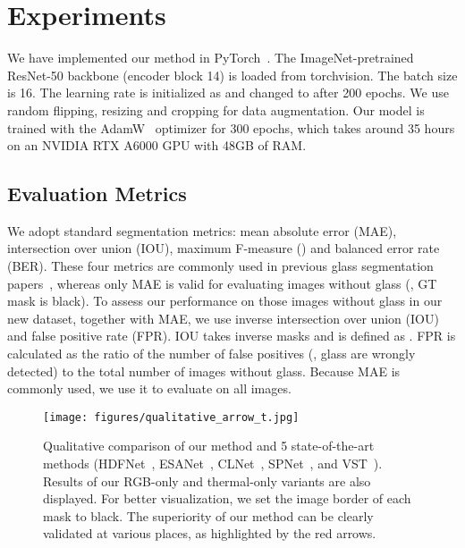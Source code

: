 \section{Experiments}
\label{sec:exp}

We have implemented our method in PyTorch~\cite{paszke2019pytorch}. The ImageNet-pretrained ResNet-50 backbone (encoder block 14) is loaded from torchvision. The batch size is 16. The learning rate is initialized as  and changed to  after 200 epochs. We use random flipping, resizing and cropping for data augmentation. Our model is trained with the  AdamW~\cite{loshchilov2017decoupled} optimizer for 300 epochs, which takes around 35 hours on an NVIDIA RTX A6000 GPU with 48GB of RAM.


\subsection{Evaluation Metrics}

We adopt standard segmentation metrics: mean absolute error (MAE), intersection over union (IOU), maximum F-measure () and balanced error rate (BER). These four metrics are commonly used in previous glass segmentation papers~\cite{mei2020don,lin2021rich,He_2021_ICCV}, whereas only MAE is valid for evaluating images without glass (\ie, GT mask is black). To assess our performance on those images without glass in our new dataset, together with MAE, we use inverse intersection over union (IOU) and false positive rate (FPR). IOU takes inverse masks and is defined as . FPR is calculated as the ratio of the number of false positives (\ie, glass are wrongly detected) to the total number of images without glass. Because  MAE is commonly used, we use it to evaluate on all images.


\begin{figure*}
\centering
\texttt{[image: figures/qualitative\_arrow\_t.jpg]}
\caption{Qualitative comparison of our method and 5 state-of-the-art methods (HDFNet~\cite{pang2020hierarchical}, ESANet~\cite{seichter2021efficient}, CLNet~\cite{zhang2021rgb}, SPNet~\cite{zhou2021specificity}, and VST~\cite{liu2021visual}). Results of our RGB-only and thermal-only variants are also displayed. For better visualization, we set the image border of each mask to black. The superiority of our method can be clearly validated at various places, as highlighted by the red arrows.}
\label{fig:qualitative}
\end{figure*}

